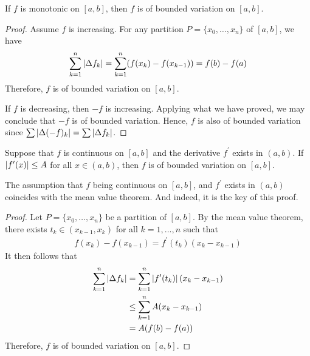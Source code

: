 \documentclass[thmcnt=section, color=blue, 12pt]{my-elegantbook}
\begin{document}
\begin{proposition} \label{prop:1}
	If $f$ is monotonic on $[a, b]$, then $f$ is of bounded variation on $[a, b]$.
\end{proposition}

\begin{proof}
	Assume $f$ is increasing.
	For any partition $P = \{x_0, \dots, x_n\}$ of $[a, b]$, we have
	\begin{align*}
		\sum_{k=1}^n \left\lvert \Delta f_k \right\rvert
		= \sum_{k=1}^n (f(x_k) - f(x_{k-1}))
		= f(b) - f(a)
	\end{align*}
	Therefore, $f$ is of bounded variation on $[a, b]$.

	If $f$ is decreasing, then $-f$ is increasing.
	Applying what we have proved, we may conclude that $-f$ is of bounded variation.
	Hence, $f$ is also of bounded variation
	since $\sum \left\lvert \Delta (-f)_k \right\rvert = \sum \left\lvert \Delta f_k \right\rvert$.
\end{proof}

\begin{proposition} \label{prop:3}
	Suppose that $f$ is continuous on $[a, b]$ and the
	derivative $f^\prime$ exists in $(a, b)$.
	If $\left\lvert f^\prime(x) \right\rvert \leq A$ for all $x \in (a, b)$,
	then $f$ is of bounded variation on $[a, b]$.
\end{proposition}

\begin{note}
	The assumption that $f$ being continuous on $[a, b]$,
	and $f^\prime$ exists in $(a, b)$ coincides with the mean value theorem.
	And indeed, it is the key of this proof.
\end{note}

\begin{proof}
	Let $P = \{x_0, \dots, x_n\}$ be a partition of $[a, b]$.
	By the mean value theorem, there exists $t_k \in (x_{k-1}, x_k)$
	for all $k=1, \dots, n$ such that
	\begin{align*}
		f(x_k) - f(x_{k-1}) = f^\prime(t_k) (x_k - x_{k-1})
	\end{align*}
	It then follows that
	\begin{align*}
		\sum_{k=1}^n \left\lvert \Delta f_k \right\rvert
		 & = \sum_{k=1}^n \left\lvert f^\prime(t_k) \right\rvert (x_k - x_{k-1}) \\
		 & \leq \sum_{k=1}^n A (x_k - x_{k-1})                \\
		 & = A (f(b) - f(a))
	\end{align*}
	Therefore, $f$ is of bounded variation on $[a, b]$.
\end{proof}
\end{document}
